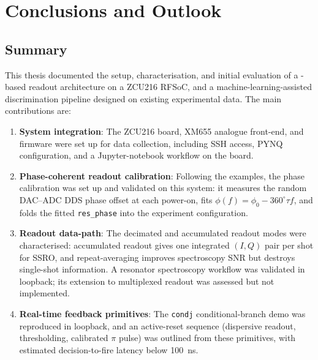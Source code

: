 \section{Conclusions and Outlook}
\label{sec:conclusions}

\subsection{Summary}

This thesis documented the setup, characterisation, and initial evaluation of a
\QICK{}-based readout architecture on a ZCU216 RFSoC, and a
machine-learning-assisted discrimination pipeline designed on existing experimental
data.  The main contributions are:

\begin{enumerate}
  \item \textbf{System integration}: The ZCU216 board, XM655 analogue front-end,
        and \QICK{} firmware were set up for data collection, including SSH
        access, PYNQ configuration, and a Jupyter-notebook workflow on the board.

  \item \textbf{Phase-coherent readout calibration}: Following the \QICK{} examples,
        the phase calibration was set up and validated on this system: it
        measures the random DAC--ADC DDS phase offset at each power-on, fits
        $\phi(f) = \phi_0 - 360^\circ \tau f$, and folds the fitted
        \texttt{res\_phase} into the experiment configuration.

  \item \textbf{Readout data-path}: The decimated and accumulated readout modes
        were characterised: accumulated readout gives one integrated $(I, Q)$ pair
        per shot for SSRO, and repeat-averaging improves spectroscopy SNR but
        destroys single-shot information.  A resonator spectroscopy workflow was
        validated in loopback; its extension to multiplexed
        readout was assessed but not implemented.

  \item \textbf{Real-time feedback primitives}: The \QICK{} \texttt{condj}
        conditional-branch demo was reproduced in loopback, and an active-reset
        sequence (dispersive readout, thresholding, calibrated $\pi$ pulse) was
        outlined from these primitives, with estimated decision-to-fire
        latency below \SI{100}{\nano\second}.


\end{enumerate}
